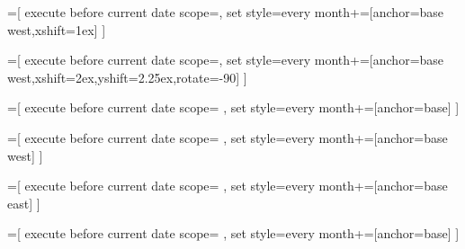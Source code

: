 =[%
execute before current date scope={},
  set style={{every month}+=[anchor=base west,xshift=1ex]}
]

=[%
  execute before current date scope={},
  set style={{every month}+=[anchor=base west,xshift=2ex,yshift=2.25ex,rotate=-90]}
]

=[%
  execute before current date scope={%
    },
  set style={{every month}+=[anchor=base]}
]
  
=[%
  execute before current date scope={%
    },
  set style={{every month}+=[anchor=base west]}
]



=[%
  execute before current date scope={%
    },
  set style={{every month}+=[anchor=base east]}
]
  
=[%
  execute before current date scope={%
    },
  set style={{every month}+=[anchor=base]}
]
  
